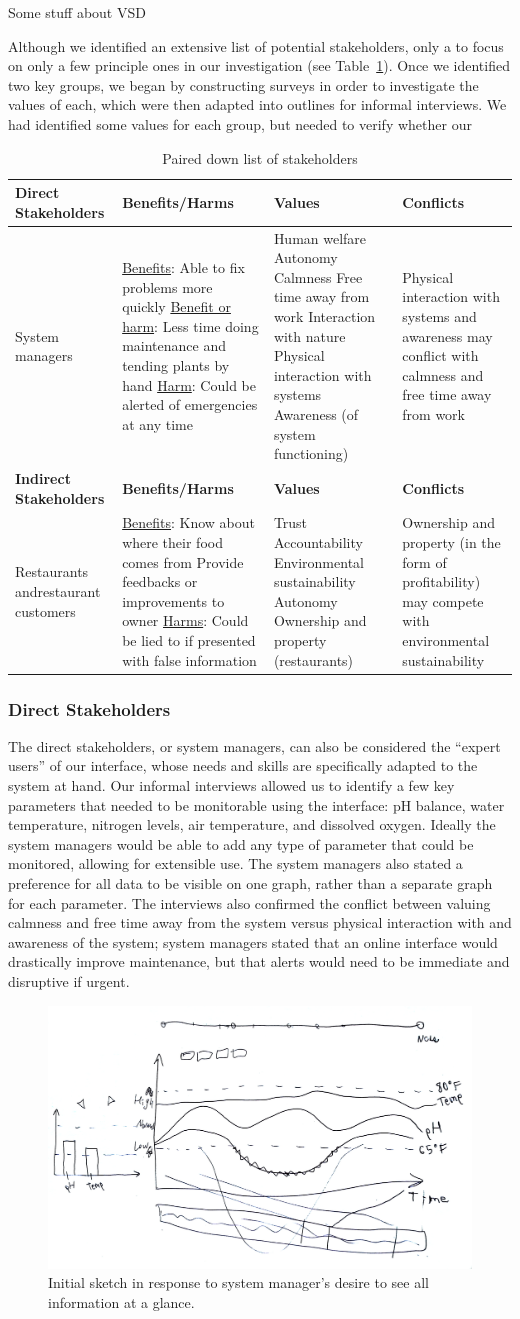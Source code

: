 \documentclass{sigchi}
\newcommand\tabhead[1]{\small\textbf{#1}}
\newcommand{\stakeholdertable}{
\begin{table}
  \centering
  	\begin{tabularx}{0.9\textwidth}{|X|X|X|X|}
    \hline
    \tabhead{Direct Stakeholders} & \tabhead{Benefits/Harms} & \tabhead{Values} & \tabhead{Conflicts} \\
    \hline
    System managers & 
		\underline{Benefits}: Able to fix problems more quickly\newline
		\underline{Benefit or harm}: Less time doing maintenance and tending plants by hand\newline
		\underline{Harm}: Could be alerted of emergencies at any time
	&	Human welfare\newline
	 	Autonomy\newline
		Calmness\newline
		Free time away from work\newline
		Interaction with nature\newline
		Physical interaction with systems\newline
		Awareness (of system functioning)
	& Physical interaction with systems and awareness may conflict with calmness and free time away from work \\
    \hline
    \tabhead{Indirect Stakeholders} & \tabhead{Benefits/Harms} & \tabhead{Values} & \tabhead{Conflicts} \\
    \hline
    Restaurants and\newline restaurant customers &
		\underline{Benefits}: Know about where their food comes from\newline
		Provide feedbacks or improvements to owner\newline
		\underline{Harms}: Could be lied to if presented with false information
	&	Trust\newline
		Accountability\newline
		Environmental sustainability\newline
		Autonomy\newline
		Ownership and property (restaurants)
	&	Ownership and property (in the form of profitability) may compete with environmental sustainability\\
    \hline
  \end{tabularx}
  \caption{Paired down list of stakeholders}
  \label{tab:stakeholders}
\end{table}}
\begin{document}
Some stuff about VSD

Although we identified an extensive list of potential stakeholders, only a to focus on only a few principle ones in our investigation (see Table~\ref{tab:stakeholders}). Once we identified two key groups, we began by constructing surveys in order to investigate the values of each, which were then adapted into outlines for informal interviews. We had identified some values for each group, but needed to verify whether our 
\stakeholdertable

\subsubsection{Direct Stakeholders}

The direct stakeholders, or system managers, can also be considered the ``expert users'' of our interface, whose needs and skills are specifically adapted to the system at hand. Our informal interviews allowed us to identify a few key parameters that needed to be monitorable using the interface: pH balance, water temperature, nitrogen levels, air temperature, and dissolved oxygen. Ideally the system managers would be able to add any type of parameter that could be monitored, allowing for extensible use. The system managers also stated a preference for all data to be visible on one graph, rather than a separate graph for each parameter. The interviews also confirmed the conflict between valuing calmness and free time away from the system versus physical interaction with and awareness of the system; system managers stated that an online interface would drastically improve maintenance, but that alerts would need to be immediate and disruptive if urgent. 

\begin{figure}[!h]
\centering
\includegraphics[width=0.9\columnwidth]{Sketch1}
\caption{Initial sketch in response to system manager's desire to see all information at a glance.}
\label{fig:sketch1}
\end{figure}
\end{document}
